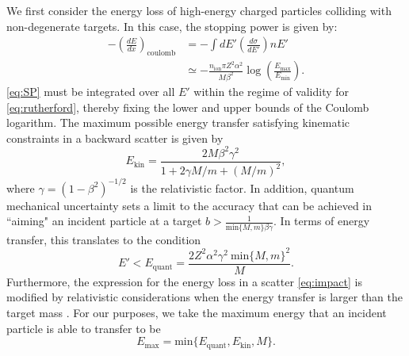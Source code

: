 \documentclass[twocolumn,showpacs,preprintnumbers,amsmath,amssymb,prd]{revtex4}
\def\r{\right)}
\def\l{\left(}
\begin{document}
\begin{appendices}
We first consider the energy loss of high-energy charged particles colliding with non-degenerate targets. In this case, the stopping power is given by:
\begin{align}
\label{eq:SP}
-\l \frac{dE}{dx}\r_\text{coulomb} & = - \int dE' \left(\frac{d \sigma}{dE'}\right) n E' \\
& \simeq -\frac{n_\text{ion} \pi Z^2 \alpha^2}{M \beta^2} \log {\l\frac{E_{\text{max}}}{E_{\text{min}}}\r}.
\end{align}
\eqref{eq:SP} must be integrated over all $E'$ within the regime of validity for \eqref{eq:rutherford}, thereby fixing the lower and upper bounds of the Coulomb logarithm. The maximum possible energy transfer satisfying kinematic constraints in a backward scatter is given by
\begin{equation}
E_{\text{kin}} = \frac{2 M \beta^2 \gamma^2}{1+ 2\gamma M/m +(M/m)^2},
\end{equation}
where $\gamma = (1-\beta^2)^{-1/2}$ is the relativistic factor. In addition, quantum mechanical uncertainty sets a limit to the accuracy that can be achieved in ``aiming" an incident particle at a target $b > \frac{1}{\text{min}\{{M, m}\} \beta \gamma}$. In terms of energy transfer, this translates to the condition
\begin{equation}
E' < E_\text{quant} = \frac{2 Z^2 \alpha^2 \gamma^2 ~\text{min}\{{M, m}\}^2}{M}.
\end{equation}
Furthermore, the expression for the energy loss in a scatter \eqref{eq:impact} is modified by relativistic considerations when the energy transfer is larger than the target mass \cite{Rossi}. For our purposes, we take the maximum energy that an incident particle is able to transfer to be
\begin{equation}
E_{\text{max}} = \text{min}\{E_\text{quant}, E_{\text{kin}}, M\}.
\end{equation}


\end{appendices}
\end{document}
